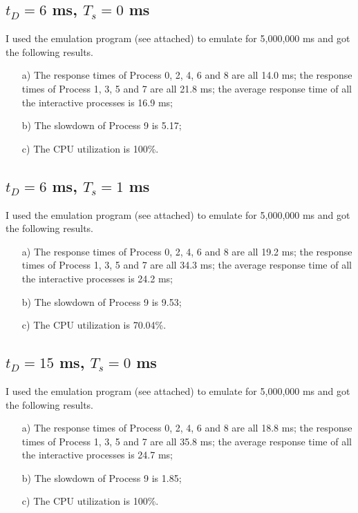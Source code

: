 \documentclass[12pt,letterpaper]{article}
\begin{document}
\subsection{$t_D=6$ ms, $T_s = 0$ ms}
I used the emulation program (see attached) to emulate for 5,000,000 ms and got the following results.
\begin{enumerate}
\item[a)] The response times of Process 0, 2, 4, 6 and 8 are all 14.0 ms; the response times of Process 1, 3, 5 and 7 are all 21.8 ms; the average response time of all the interactive processes is 16.9 ms;
\item[b)] The slowdown of Process 9 is 5.17;
\item[c)] The CPU utilization is 100\%.
\end{enumerate}

\subsection{$t_D=6$ ms, $T_s = 1$ ms}
I used the emulation program (see attached) to emulate for 5,000,000 ms and got the following results.
\begin{enumerate}
\item[a)] The response times of Process 0, 2, 4, 6 and 8 are all 19.2 ms; the response times of Process 1, 3, 5 and 7 are all 34.3 ms; the average response time of all the interactive processes is 24.2 ms;
\item[b)] The slowdown of Process 9 is 9.53;
\item[c)] The CPU utilization is 70.04\%.
\end{enumerate}

\subsection{$t_D=15$ ms, $T_s = 0$ ms}
I used the emulation program (see attached) to emulate for 5,000,000 ms and got the following results.
\begin{enumerate}
\item[a)] The response times of Process 0, 2, 4, 6 and 8 are all 18.8 ms; the response times of Process 1, 3, 5 and 7 are all 35.8 ms; the average response time of all the interactive processes is 24.7 ms;
\item[b)] The slowdown of Process 9 is 1.85;
\item[c)] The CPU utilization is 100\%.
\end{enumerate}
\end{document}
